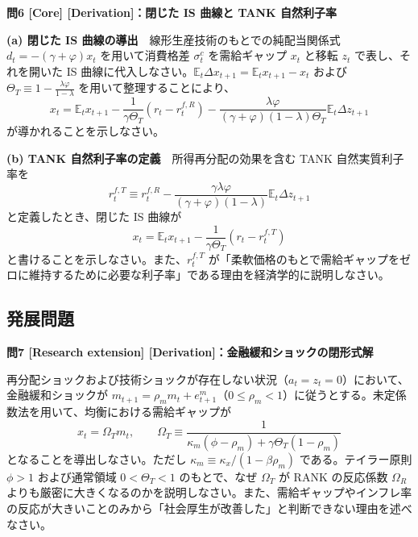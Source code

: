 \documentclass[
  japanese,
  lualatex,
  ja=standard,
  12pt,
  a4paper]{ltjsarticle}
\begin{document}

\textbf{問6 {[}Core{]} {[}Derivation{]}：閉じた IS 曲線と TANK
自然利子率}

\textbf{(a) 閉じた IS 曲線の導出}　線形生産技術のもとでの純配当関係式
\(d_t = -(\gamma+\varphi) x_t\) を用いて消費格差 \(\sigma_t^c\)
を需給ギャップ \(x_t\) と移転 \(z_t\) で表し、それを開いた IS
曲線に代入しなさい。\(\mathbb{E}_t \Delta x_{t+1} = \mathbb{E}_t x_{t+1} - x_t\)
および \(\Theta_T \equiv 1 - \frac{\lambda \varphi}{1-\lambda}\)
を用いて整理することにより、 \[
x_t
=
\mathbb{E}_t x_{t+1}
-
\frac{1}{\gamma \Theta_T}(r_t - r_t^{f,R})
-
\frac{\lambda \varphi}{(\gamma+\varphi)(1-\lambda)\Theta_T} \mathbb{E}_t \Delta z_{t+1}
\] が導かれることを示しなさい。

\textbf{(b) TANK 自然利子率の定義}　所得再分配の効果を含む TANK
自然実質利子率を \[
r_t^{f,T} \equiv r_t^{f,R} - \frac{\gamma \lambda \varphi}{(\gamma+\varphi)(1-\lambda)} \mathbb{E}_t \Delta z_{t+1}
\] と定義したとき、閉じた IS 曲線が \[
x_t = \mathbb{E}_t x_{t+1} - \frac{1}{\gamma \Theta_T}(r_t - r_t^{f,T})
\] と書けることを示しなさい。また、\(r_t^{f,T}\)
が「柔軟価格のもとで需給ギャップをゼロに維持するために必要な利子率」である理由を経済学的に説明しなさい。


\subsection{発展問題}\label{ux767aux5c55ux554fux984c}


\textbf{問7 {[}Research extension{]}
{[}Derivation{]}：金融緩和ショックの閉形式解}

再分配ショックおよび技術ショックが存在しない状況（\(a_t = z_t = 0\)）において、金融緩和ショックが
\(m_{t+1} = \rho_m m_t + e_{t+1}^m\)（\(0 \leq \rho_m < 1\)）に従うとする。未定係数法を用いて、均衡における需給ギャップが
\[
x_t = \Omega_T m_t,
\qquad
\Omega_T \equiv \frac{1}{\kappa_m(\phi - \rho_m) + \gamma \Theta_T(1 - \rho_m)}
\] となることを導出しなさい。ただし
\(\kappa_m \equiv \kappa_x / (1 - \beta \rho_m)\) である。テイラー原則
\(\phi>1\) および通常領域 \(0<\Theta_T<1\) のもとで、なぜ \(\Omega_T\)
が RANK の反応係数 \(\Omega_R\)
よりも厳密に大きくなるのかを説明しなさい。また、需給ギャップやインフレ率の反応が大きいことのみから「社会厚生が改善した」と判断できない理由を述べなさい。

\end{document}
